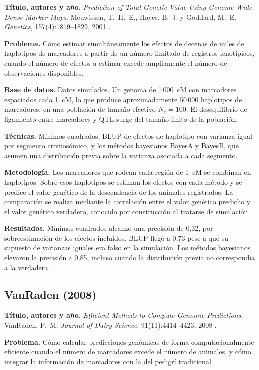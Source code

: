 \documentclass[conference]{IEEEtran}
\begin{document}
\textbf{Título, autores y año.} \textit{Prediction of Total Genetic Value
Using Genome-Wide Dense Marker Maps}. Meuwissen, T.~H.~E., Hayes, B.~J.
y Goddard, M.~E. \textit{Genetics}, 157(4):1819--1829, 2001
\cite{meuwissen2001}.

\textbf{Problema.} Cómo estimar simultáneamente los efectos de decenas de
miles de haplotipos de marcadores a partir de un número limitado de
registros fenotípicos, cuando el número de efectos a estimar excede
ampliamente el número de observaciones disponibles.

\textbf{Base de datos.} Datos simulados. Un genoma de 1\,000~cM con
marcadores espaciados cada 1~cM, lo que produce aproximadamente 50\,000
haplotipos de marcadores, en una población de tamaño efectivo
$N_e = 100$. El desequilibrio de ligamiento entre marcadores y QTL surge
del tamaño finito de la población.

\textbf{Técnicas.} Mínimos cuadrados, BLUP de efectos de haplotipo con
varianza igual por segmento cromosómico, y los métodos bayesianos BayesA
y BayesB, que asumen una distribución previa sobre la varianza asociada a
cada segmento.

\textbf{Metodología.} Los marcadores que rodean cada región de 1~cM se
combinan en haplotipos. Sobre esos haplotipos se estiman los efectos con
cada método y se predice el valor genético de la descendencia de los
animales registrados. La comparación se realiza mediante la correlación
entre el valor genético predicho y el valor genético verdadero, conocido
por construcción al tratarse de simulación.

\textbf{Resultados.} Mínimos cuadrados alcanzó una precisión de 0{,}32,
por sobreestimación de los efectos incluidos. BLUP llegó a 0{,}73 pese a
que su supuesto de varianzas iguales era falso en la simulación. Los
métodos bayesianos elevaron la precisión a 0{,}85, incluso cuando la
distribución previa no correspondía a la verdadera.

\subsection{VanRaden (2008)}

\textbf{Título, autores y año.} \textit{Efficient Methods to Compute
Genomic Predictions}. VanRaden, P.~M. \textit{Journal of Dairy Science},
91(11):4414--4423, 2008 \cite{vanraden2008}.

\textbf{Problema.} Cómo calcular predicciones genómicas de forma
computacionalmente eficiente cuando el número de marcadores excede el
número de animales, y cómo integrar la información de marcadores con la
del pedigrí tradicional.
\end{document}
